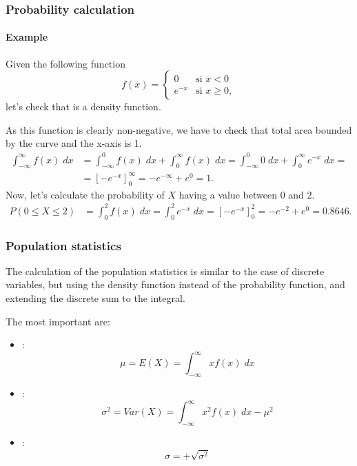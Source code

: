 \begin{frame}
\frametitle{Probability calculation}
\framesubtitle{Example}
Given the following function
\[
f(x) =
\begin{cases}
0 & \mbox{si $x<0$}\\
e^{-x} & \mbox{si $x\geq 0$},
\end{cases}
\]
let's check that is a density function. 

As this function is clearly non-negative, we have to check that total area bounded by the curve and the x-axis is 1.
\begin{align*}
\int_{-\infty}^\infty f(x)\;dx &= \int_{-\infty}^0 f(x)\;dx +\int_0^\infty f(x)\;dx = \int_{-\infty}^0 0\;dx +\int_0^\infty e^{-x}\;dx =\\
&= \left[-e^{-x}\right]_0^{\infty} = -e^{-\infty}+e^0 = 1.
\end{align*}
Now, let's calculate the probability of $X$ having a value between 0 and 2. 
\begin{align*}
P(0\leq X\leq 2) &= \int_0^2 f(x)\;dx = \int_0^2 e^{-x}\;dx = \left[-e^{-x}\right]_0^2 = -e^{-2}+e^0 = 0.8646.
\end{align*}
\end{frame}


\begin{frame}
\frametitle{Population statistics}
The calculation of the population statistics is similar to the case of discrete variables, but using the density
function instead of the probability function, and extending the discrete sum to the integral.

The most important are:
\begin{itemize}
\item {}:
\[
\mu = E(X) = \int_{-\infty}^\infty x f(x)\; dx
\]
\item {}:
\[
\sigma^2 = Var(X) = \int_{-\infty}^\infty x^2f(x)\; dx -\mu^2
\]
\item {}:
\[
\sigma = +\sqrt{\sigma^2}
\]
\end{itemize}
\end{frame}


